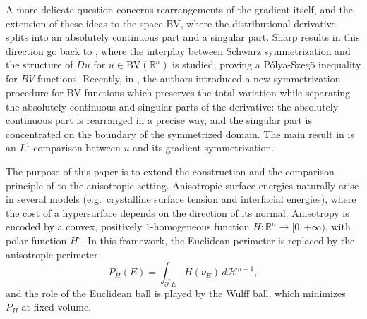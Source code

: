 \documentclass[oneside,a4paper,12pt,notitlepage]{article}
\theoremstyle{definition}
\newcommand{\R}{\mathbb{R}}
\newcommand{\BV}{\text{BV}}
\begin{document}
A more delicate question concerns rearrangements of the gradient itself, and the extension of these ideas to the space $\BV$,
where the distributional derivative splits into an absolutely continuous part and a singular part.
Sharp results in this direction go back to  \cite{CF}, where  the interplay between Schwarz symmetrization and the
 structure of $Du$ for $u\in\BV(\R^n)$ is studied, proving a  P\'olya-Szeg\"o inequality for $BV$ functions. Recently, in  \cite{AGNT24}, the authors introduced a new symmetrization
procedure for $\BV$ functions which preserves the total variation while separating the absolutely continuous and singular parts
of the derivative: the absolutely continuous part is rearranged in a precise way, and the singular part is concentrated on the boundary of the
symmetrized domain. The main result  in  \cite{AGNT24} is an $L^1$-comparison between $u$ and its gradient symmetrization. 

The purpose of this paper is to extend the construction and the comparison principle of \cite{AGNT24} to the anisotropic setting.
Anisotropic surface energies naturally arise in several models (e.g.\ crystalline surface tension and interfacial energies), where the cost of a
hypersurface depends on the direction of its normal. Anisotropy is encoded by a convex, positively $1$-homogeneous function
$H:\R^n\to[0,+\infty)$, with polar function $H^\circ$. In this framework, the Euclidean perimeter is replaced by the anisotropic perimeter
\[
P_H(E)=\int_{\partial^*E} H(\nu_E)\,d\mathcal H^{n-1},
\]
and the role of the Euclidean ball is played by the Wulff ball, which minimizes $P_H$ at fixed volume.
\end{document}
